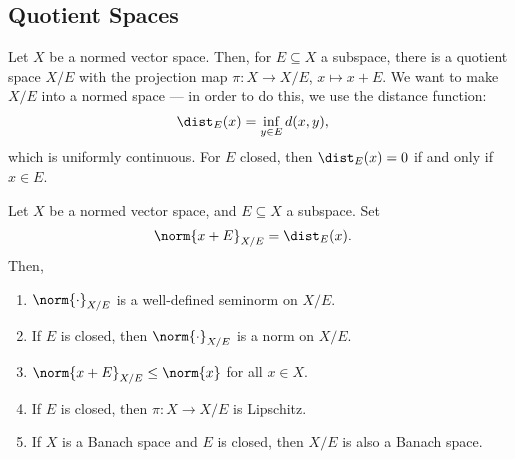 \documentclass[10pt]{mypackage}
\begin{document}
\subsection{Quotient Spaces}%
Let $X$ be a normed vector space. Then, for $E\subseteq X$ a subspace, there is a quotient space $X/E$ with the projection map $\pi: X\rightarrow X/E$, $x\mapsto x + E$. We want to make $X/E$ into a normed space --- in order to do this, we use the distance function:
\begin{align*}
  \dist_{E}(x) &= \inf_{y\in E}d(x,y),
\end{align*}
which is uniformly continuous. For $E$ closed, then $\dist_{E}(x) = 0$ if and only if $x\in E$.
\begin{proposition}
  Let $X$ be a normed vector space, and $E\subseteq X$ a subspace. Set
  \begin{align*}
    \norm{x + E}_{X/E} &= \dist_{E}(x).
  \end{align*}
  Then,
  \begin{enumerate}[(1)]
    \item $\norm{\cdot}_{X/E}$ is a well-defined seminorm on $X/E$.
    \item If $E$ is closed, then $\norm{\cdot}_{X/E}$ is a norm on $X/E$.
    \item $\norm{x+E}_{X/E} \leq \norm{x}$ for all $x\in X$.
    \item If $E$ is closed, then $\pi: X\rightarrow X/E$ is Lipschitz.
    \item If $X$ is a Banach space and $E$ is closed, then $X/E$ is also a Banach space.
  \end{enumerate}
\end{proposition}
\end{document}
